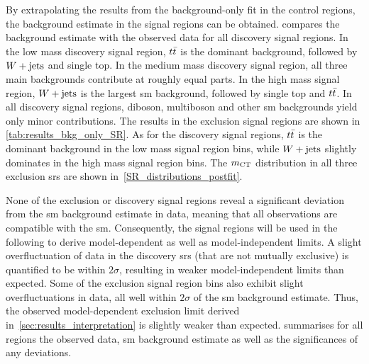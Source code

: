 By extrapolating the results from the background-only fit in the control regions, the background estimate in the signal regions can be obtained.  compares the background estimate with the observed data for all discovery signal regions. In the low mass discovery signal region, $t\bar{t}$ is the dominant background, followed by $W+\mathrm{jets}$ and single top. In the medium mass discovery signal region, all three main backgrounds contribute at roughly equal parts. In the high mass signal region, $W+\mathrm{jets}$ is the largest \gls{sm} background, followed by single top and $t\bar{t}$. In all discovery signal regions, diboson, multiboson and other \gls{sm} backgrounds yield only minor contributions. The results in the exclusion signal regions are shown in \cref{tab:results_bkg_only_SR}. As for the discovery signal regions, $t\bar{t}$ is the dominant background in the low mass signal region bins, while $W+\mathrm{jets}$ slightly dominates in the high mass signal region bins. The $m_{\textrm{CT}}$ distribution in all three exclusion \glspl{sr} are shown in~\cref{SR_distributions_postfit}.

None of the exclusion or discovery signal regions reveal a significant deviation from the \gls{sm} background estimate in data, meaning that all observations are compatible with the \gls{sm}. Consequently, the signal regions will be used in the following to derive model-dependent as well as model-independent limits. A slight overfluctuation of data in the discovery \glspl{sr} (that are not mutually exclusive) is quantified to be within $2\sigma$, resulting in weaker model-independent limits than expected. Some of the exclusion signal region bins also exhibit slight overfluctuations in data, all well within $2\sigma$ of the \gls{sm} background estimate. Thus, the observed model-dependent exclusion limit derived in~\cref{sec:results_interpretation} is slightly weaker than expected.  summarises for all regions the observed data, \gls{sm} background estimate as well as the significances of any deviations.





